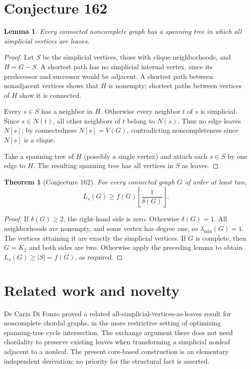 \documentclass[11pt]{article}
\newtheorem{theorem}{Theorem}
\newtheorem{lemma}{Lemma}
\begin{document}
\section{Conjecture 162}
\begin{lemma}
Every connected noncomplete graph has a spanning tree in which all simplicial vertices are leaves.
\end{lemma}
\begin{proof}
Let $S$ be the simplicial vertices, those with clique neighborhoods, and $H=G-S$. A shortest path has no simplicial internal vertex, since its predecessor and successor would be adjacent. A shortest path between nonadjacent vertices shows that $H$ is nonempty; shortest paths between vertices of $H$ show it is connected.

Every $s\in S$ has a neighbor in $H$. Otherwise every neighbor $t$ of $s$ is simplicial. Since $s\in N(t)$, all other neighbors of $t$ belong to $N(s)$. Thus no edge leaves $N[s]$; by connectedness $N[s]=V(G)$, contradicting noncompleteness since $N[s]$ is a clique.

Take a spanning tree of $H$ (possibly a single vertex) and attach each $s\in S$ by one edge to $H$. The resulting spanning tree has all vertices in $S$ as leaves.
\end{proof}
\begin{theorem}[Conjecture 162]
For every connected graph $G$ of order at least two,
\[
 L_s(G)\ge f(G)\left\lfloor \frac{1}{\delta(G)}\right\rfloor.
\]
\end{theorem}
\begin{proof}
If $\delta(G)\ge 2$, the right-hand side is zero. Otherwise $\delta(G)=1$. All neighborhoods are nonempty, and some vertex has degree one, so $\lambda_{\min}(G)=1$. The vertices attaining it are exactly the simplicial vertices. If $G$ is complete, then $G=K_2$ and both sides are two. Otherwise apply the preceding lemma to obtain $L_s(G)\ge |S|=f(G)$, as required.
\end{proof}
\section{Related work and novelty}
De Caria Di Fonzo \cite[Proposition 3.1]{dc} proved a related all-simplicial-vertices-as-leaves result for noncomplete chordal graphs, in the more restrictive setting of optimizing spanning-tree cycle intersection. The exchange argument there does not need chordality to preserve existing leaves when transforming a simplicial nonleaf adjacent to a nonleaf. The present core-based construction is an elementary independent derivation; no priority for the structural fact is asserted.
\end{document}
